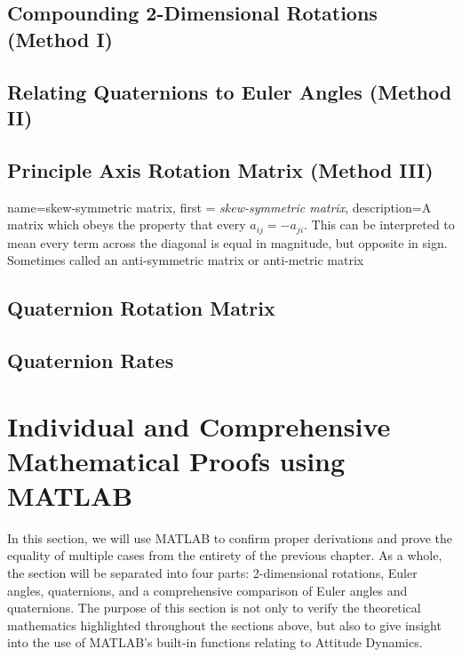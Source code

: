 \documentclass[12pt]{report}
\begin{document}
\subsection{Compounding 2-Dimensional Rotations (Method I)}

\subsection{Relating Quaternions to Euler Angles (Method II)}

\subsection{Principle Axis Rotation Matrix (Method III)}\label{sec:PrincipleAxisRotationMatrix}

{
    name=skew-symmetric matrix,
    first = {\textit{skew-symmetric matrix}},
    description={A matrix which obeys the property that every $a_{ij}=-a_{ji}$. This can be interpreted to mean every term across the diagonal is equal in magnitude, but opposite in sign. Sometimes called an anti-symmetric matrix or anti-metric matrix}
}



\subsection{Quaternion Rotation Matrix}



\subsection{Quaternion Rates}\label{sec: quaternion rates}





\section{Individual and Comprehensive Mathematical Proofs using MATLAB}\label{sec:MathematicalProofRotations}

In this section, we will use MATLAB to confirm proper derivations and prove the equality of multiple cases from the entirety of the previous chapter. As a whole, the section will be separated into four parts: 2-dimensional rotations, Euler angles, quaternions, and a comprehensive comparison of Euler angles and quaternions. The purpose of this section is not only to verify the theoretical mathematics highlighted throughout the sections above, but also to give insight into the use of MATLAB's built-in functions relating to Attitude Dynamics.
\end{document}
